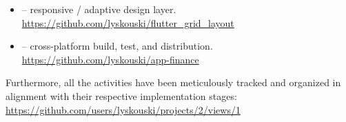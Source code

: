 \begin{itemize}
\item {} -- responsive / adaptive design layer.\\
\href{https://github.com/lyskouski/flutter\_grid\_layout}{https://github.com/lyskouski/flutter\_grid\_layout}

\item {} -- cross-platform build, test, and distribution.\\
\href{https://github.com/lyskouski/app-finance/tree/main/.github/workflows}{https://github.com/lyskouski/app-finance}

\end{itemize}

\noindent Furthermore, all the activities have been meticulously tracked and organized in alignment with their 
respective implementation stages:
\href{https://github.com/users/lyskouski/projects/2/views/1}{https://github.com/users/lyskouski/projects/2/views/1}
